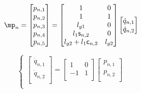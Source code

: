 \begin{itemize}
\begin{equation}
\mp_n = \begin{bmatrix}
p_{n,1} \\
p_{n,2} \\
p_{n,3} \\
p_{n,4} \\
p_{n,5} \\
\end{bmatrix}
=
\begin{bmatrix}
1 & 0 \\
1 & 1 \\
l_{g1} & 0\\
l_1 \ssin_{n,2} & 0 \\
l_{g2} + l_1 \ccos_{n,2} & l_{g2}
\end{bmatrix}
\begin{bmatrix}
\dot{q}_{n,1} \\
\dot{q}_{n,2} \\
\end{bmatrix}
\end{equation}

\begin{equation}
\begin{cases}

\begin{bmatrix}
\dot{q}_{n,1} \\
\dot{q}_{n,2} \\
\end{bmatrix}
=
\begin{bmatrix}
1 & 0 \\
-1 & 1\\
\end{bmatrix}
\begin{bmatrix}
p_{n,1} \\
p_{n,2} \\
\end{bmatrix} \\



\end{cases}
\end{equation}
\end{itemize}
